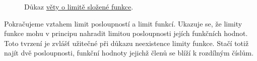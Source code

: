 \begin{figure}[ht]
 \caption{Důkaz \hyperref[thm:limita-slozene-funkce]{věty o limitě složené
 funkce}.}
 \label{fig:limita-slozene-funkce}
\end{figure}

Pokračujeme vztahem limit posloupností a limit funkcí. Ukazuje se, že limity
funkce mohu v principu nahradit limitou posloupnosti jejích funkčních hodnot.
Toto tvrzení je zvlášť užitečné při důkazu neexistence limity funkce. Stačí
totiž najít dvě posloupnosti, funkční hodnoty jejichž členů se blíží k rozdílným
číslům.

